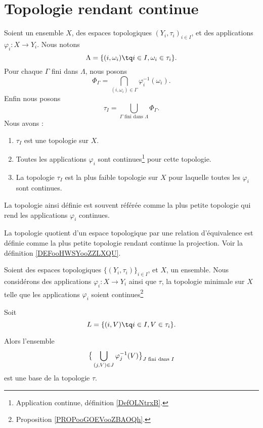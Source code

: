 \section{Topologie rendant continue}

\begin{proposition}     \label{PROPooGOEVooZBAOQh}
	Soient un ensemble \( X\), des espaces topologiques \( (Y_i,\tau_i)_{i\in I}\), et des applications \( \varphi_i\colon X\to Y_i\). Nous notons
	\begin{equation}
		\Lambda=\{ (i,\omega_i)\tq i\in I, \omega_i\in \tau_i \}.
	\end{equation}
	Pour chaque \( \Gamma\) fini dans \( \Lambda\), nous posons
	\begin{equation}
		\Phi_{\Gamma}=\bigcap_{(i,\omega_i)\in \Gamma}\varphi_i^{-1}(\omega_i).
	\end{equation}
	Enfin nous posons
	\begin{equation}
		\tau_I=\bigcup_{\Gamma\text{ fini dans } \Lambda}\Phi_{\Gamma}.
	\end{equation}
	Nous avons :
	\begin{enumerate}
		\item
		      \( \tau_I\) est une topologie sur \( X\).
		\item
		      Toutes les applications \( \varphi_i\) sont continues\footnote{Application continue, définition \ref{DefOLNtrxB}.} pour cette topologie.
		\item
		      La topologie \( \tau_I\) est la plus faible topologie sur \( X\) pour laquelle toutes les \( \varphi_i\) sont continues.
	\end{enumerate}

	La topologie ainsi définie est souvent référée comme la plus petite topologie qui rend les applications \( \varphi_i\) continues.
\end{proposition}

La topologie quotient d'un espace topologique par une relation d'équivalence est définie comme la plus petite topologie rendant continue la projection. Voir la définition \ref{DEFooHWSYooZZLXQU}.

\begin{lemma}     \label{LEMooVRGFooNgbwKu}
	Soient des espaces topologiques \( \{ (Y_i,\tau_i) \}_{i\in I}\), et \( X\), un ensemble. Nous considérons des applications \( \varphi_i\colon X\to Y_i\) ainsi que \( \tau\), la topologie minimale sur \( X\) telle que les applications \( \varphi_i\) soient continues\footnote{Proposition \ref{PROPooGOEVooZBAOQh}.}

	Soit
	\begin{equation}
		L=\{ (i,V)\tq i\in I,V\in \tau_i \}.
	\end{equation}

	Alors l'ensemble
	\begin{equation}
		\big\{ \bigcup_{(j,V)\in J}\varphi_j^{-1}(V) \big\}_{\text{\( J\) fini dans \( I\)}}
	\end{equation}
	est une base de la topologie \( \tau\).
\end{lemma}

